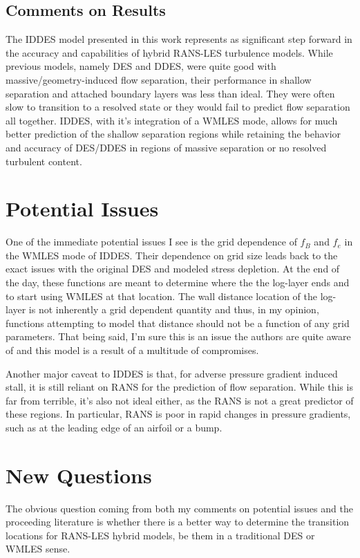 \documentclass{ucb}
\begin{document}
\subsection{Comments on Results}
The IDDES model presented in this work represents as significant step forward in the accuracy and capabilities of hybrid RANS-LES turbulence models. While previous models, namely DES and DDES, were quite good with massive/geometry-induced flow separation, their performance in shallow separation and attached boundary layers was less than ideal. They were often slow to transition to a resolved state or they would fail to predict flow separation all together. IDDES, with it's integration of a WMLES mode, allows for much better prediction of the shallow separation regions while retaining the behavior and accuracy of DES/DDES in regions of massive separation or no resolved turbulent content.


\section{Potential Issues}
One of the immediate potential issues I see is the grid dependence of \(f_B \) and \(f_e \) in the WMLES mode of IDDES. Their dependence on grid size leads back to the exact issues with the original DES and modeled stress depletion. At the end of the day, these functions are meant to determine where the the log-layer ends and to start using WMLES at that location. The wall distance location of the log-layer is not inherently a grid dependent quantity and thus, in my opinion, functions attempting to model that distance should not be a function of any grid parameters. That being said, I'm sure this is an issue the authors are quite aware of and this model is a result of a multitude of compromises.

Another major caveat to IDDES is that, for adverse pressure gradient induced stall, it is still reliant on RANS for the prediction of flow separation. While this is far from terrible, it's also not ideal either, as the RANS is not a great predictor of these regions. 
In particular, RANS is poor in rapid changes in pressure gradients, such as at the leading edge of an airfoil or a bump. 



\section{New Questions}
The obvious question coming from both my comments on potential issues and the proceeding literature is whether there is a better way to determine the transition locations for RANS-LES hybrid models, be them in a traditional DES or WMLES sense.

\ucbbib{}
    
\end{document}
